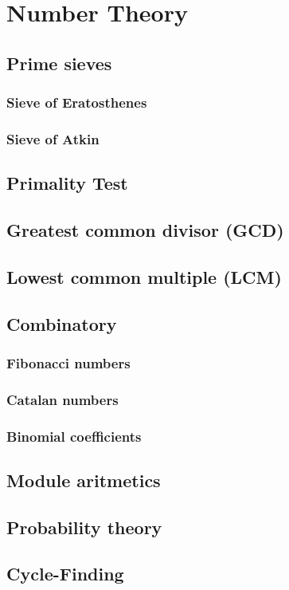 \chapter{Number Theory}
	\section{Prime sieves}
		\subsection{Sieve of Eratosthenes}
		\subsection{Sieve of Atkin}
	\section{Primality Test}
	\section{Greatest common divisor (GCD)}
	\section{Lowest common multiple (LCM)}
	\section{Combinatory}
		\subsection{Fibonacci numbers}
		\subsection{Catalan numbers}
		\subsection{Binomial coefficients}
	\section{Module aritmetics}
	\section{Probability theory}
	\section{Cycle-Finding}
